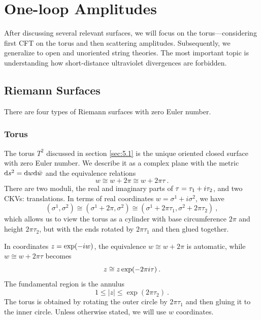 
\chapter{\texorpdfstring{One-loop Amplitudes}{7 One-loop Amplitudes}} \label{cha:7} 
After discussing several relevant surfaces, we will focus on the torus—considering first CFT on the torus and then scattering amplitudes. 
Subsequently, we generalize to open and unoriented string theories. 
The most important topic is understanding how short-distance ultraviolet divergences are forbidden. 

\section{\texorpdfstring{Riemann Surfaces}{7.1 Riemann Surfaces}} \label{sec:7.1} 

There are four types of Riemann surfaces with zero Euler number. 

\subsection*{Torus} 

The torus $T^{2}$ discussed in section \ref{sec:5.1} is the unique oriented closed surface with zero Euler number. 
We describe it as a complex plane with the metric $\mathrm{d} s^{2}=\mathrm{d} w \mathrm{d} \bar{w}$ and the equivalence relations 
\begin{equation}
	w \cong w+2 \pi \cong w+2 \pi \tau \:. \label{7.1.1} 
\end{equation}
There are two moduli, the real and imaginary parts of $\tau=\tau_{1}+i \tau_{2}$, and two CKVs: translations. 
In terms of real coordinates $w=\sigma^{1}+i \sigma^{2}$, we have 
\begin{equation}
	(\sigma^{1}, \sigma^{2}) \cong (\sigma^{1}+2 \pi, \sigma^{2}) \cong (\sigma^{1}+2 \pi \tau_{1}, \sigma^{2}+2 \pi \tau_{2}) \:, \label{7.1.2} 
\end{equation}
which allows us to view the torus as a cylinder with base circumference $2 \pi$ and height $2 \pi \tau_{2}$, but with the ends rotated by $2 \pi \tau_{1}$ and then glued together. 

In coordinates $z=\exp (-i w)$, the equivalence $w \cong w+2 \pi$ is automatic, while $w \cong w+2 \pi \tau$ becomes 
\begin{equation}
	z \cong z \exp (-2 \pi i \tau) \:. \label{7.1.3} 
\end{equation}
The fundamental region is the annulus 
\begin{equation}
	1 \leq|z| \leq \exp (2 \pi \tau_{2}) \:. \label{7.1.4} 
\end{equation}
The torus is obtained by rotating the outer circle by $2 \pi \tau_{1}$ and then gluing it to the inner circle. 
Unless otherwise stated, we will use $w$ coordinates. 

